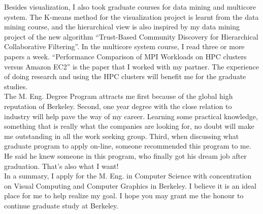 \documentclass{article}
\begin{document}
Besides visualization, I also took graduate courses for data mining and multicore system. The K-means method for the visualization project is learnt from the data mining course, and the hierarchical view is also inspired by my data mining project of the new algorithm ``Trust-Based Community Discovery for Hierarchical Collaborative Filtering''. In the multicore system course, I read three or more papers a week. ``Performance Comparison of MPI Workloads on HPC clusters versus Amazon EC2'' is the paper that I worked with my partner. The experience of doing research and using the HPC clusters will benefit me for the graduate studies.  \\


The M. Eng. Degree Program attracts me first because of the global high reputation of Berkeley. Second, one year degree with the close relation to industry will help pave the way of my career. Learning some practical knowledge, something that is really what the companies are looking for, no doubt will make me outstanding in all the work seeking group. Third, when discussing what graduate program to apply on-line, someone recommended this program to me. He said he knew someone in this program, who finally got his dream job after graduation. That's also what I want! \\

In a summary, I apply for the M. Eng. in Computer Science with concentration on Visual Computing and Computer Graphics in Berkeley. I believe it is an ideal place for me to help realize my goal. I hope you may grant me the honour to continue graduate study at Berkeley.  \\
\end{document}
